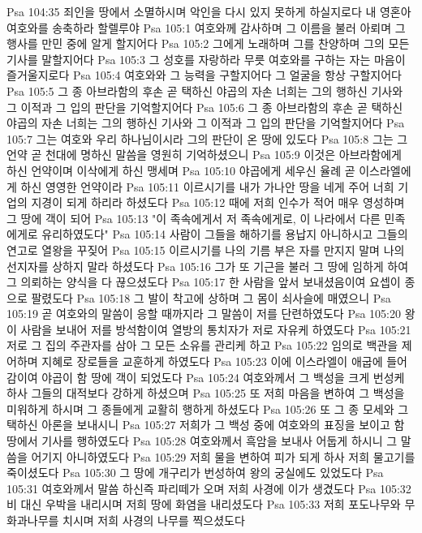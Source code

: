 Psa 104:35  죄인을 땅에서 소멸하시며 악인을 다시 있지 못하게 하실지로다 내 영혼아 여호와를 송축하라 할렐루야
Psa 105:1  여호와께 감사하며 그 이름을 불러 아뢰며 그 행사를 만민 중에 알게 할지어다
Psa 105:2  그에게 노래하며 그를 찬양하며 그의 모든 기사를 말할지어다
Psa 105:3  그 성호를 자랑하라 무릇 여호와를 구하는 자는 마음이 즐거울지로다
Psa 105:4  여호와와 그 능력을 구할지어다 그 얼굴을 항상 구할지어다
Psa 105:5  그 종 아브라함의 후손 곧 택하신 야곱의 자손 너희는 그의 행하신 기사와 그 이적과 그 입의 판단을 기억할지어다
Psa 105:6  그 종 아브라함의 후손 곧 택하신 야곱의 자손 너희는 그의 행하신 기사와 그 이적과 그 입의 판단을 기억할지어다
Psa 105:7  그는 여호와 우리 하나님이시라 그의 판단이 온 땅에 있도다
Psa 105:8  그는 그 언약 곧 천대에 명하신 말씀을 영원히 기억하셨으니
Psa 105:9  이것은 아브라함에게 하신 언약이며 이삭에게 하신 맹세며
Psa 105:10  야곱에게 세우신 율례 곧 이스라엘에게 하신 영영한 언약이라
Psa 105:11  이르시기를 내가 가나안 땅을 네게 주어 너희 기업의 지경이 되게 하리라 하셨도다
Psa 105:12  때에 저희 인수가 적어 매우 영성하며 그 땅에 객이 되어
Psa 105:13  "이 족속에게서 저 족속에게로, 이 나라에서 다른 민족에게로 유리하였도다"
Psa 105:14  사람이 그들을 해하기를 용납지 아니하시고 그들의 연고로 열왕을 꾸짖어
Psa 105:15  이르시기를 나의 기름 부은 자를 만지지 말며 나의 선지자를 상하지 말라 하셨도다
Psa 105:16  그가 또 기근을 불러 그 땅에 임하게 하여 그 의뢰하는 양식을 다 끊으셨도다
Psa 105:17  한 사람을 앞서 보내셨음이여 요셉이 종으로 팔렸도다
Psa 105:18  그 발이 착고에 상하며 그 몸이 쇠사슬에 매였으니
Psa 105:19  곧 여호와의 말씀이 응할 때까지라 그 말씀이 저를 단련하였도다
Psa 105:20  왕이 사람을 보내어 저를 방석함이여 열방의 통치자가 저로 자유케 하였도다
Psa 105:21  저로 그 집의 주관자를 삼아 그 모든 소유를 관리케 하고
Psa 105:22  임의로 백관을 제어하며 지혜로 장로들을 교훈하게 하였도다
Psa 105:23  이에 이스라엘이 애굽에 들어감이여 야곱이 함 땅에 객이 되었도다
Psa 105:24  여호와께서 그 백성을 크게 번성케 하사 그들의 대적보다 강하게 하셨으며
Psa 105:25  또 저희 마음을 변하여 그 백성을 미워하게 하시며 그 종들에게 교활히 행하게 하셨도다
Psa 105:26  또 그 종 모세와 그 택하신 아론을 보내시니
Psa 105:27  저희가 그 백성 중에 여호와의 표징을 보이고 함 땅에서 기사를 행하였도다
Psa 105:28  여호와께서 흑암을 보내사 어둡게 하시니 그 말씀을 어기지 아니하였도다
Psa 105:29  저희 물을 변하여 피가 되게 하사 저희 물고기를 죽이셨도다
Psa 105:30  그 땅에 개구리가 번성하여 왕의 궁실에도 있었도다
Psa 105:31  여호와께서 말씀 하신즉 파리떼가 오며 저희 사경에 이가 생겼도다
Psa 105:32  비 대신 우박을 내리시며 저희 땅에 화염을 내리셨도다
Psa 105:33  저희 포도나무와 무화과나무를 치시며 저희 사경의 나무를 찍으셨도다
